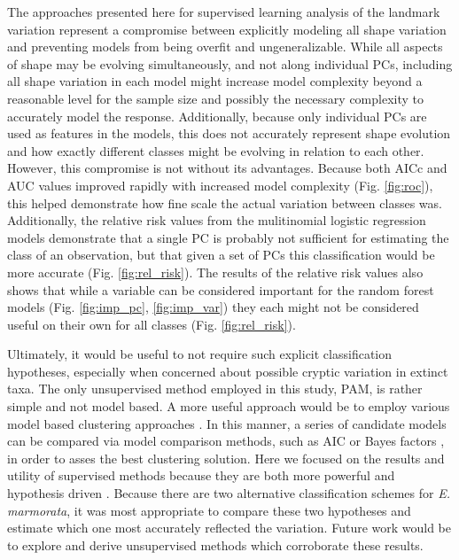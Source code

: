 \documentclass[12pt,letterpaper]{article}\usepackage{graphicx, color}
\begin{document}
The approaches presented here for supervised learning analysis of the landmark variation represent a compromise between explicitly modeling all shape variation and preventing models from being overfit and ungeneralizable. While all aspects of shape may be evolving simultaneously, and not along individual PCs, including all shape variation in each model might increase model complexity beyond a reasonable level for the sample size and possibly the necessary complexity to accurately model the response. Additionally, because only individual PCs are used as features in the models, this does not accurately represent shape evolution and how exactly different classes might be evolving in relation to each other. However, this compromise is not without its advantages. Because both AICc and AUC values improved rapidly with increased model complexity (Fig. \ref{fig:roc}), this helped demonstrate how fine scale the actual variation between classes was. Additionally, the relative risk values from the mulitinomial logistic regression models demonstrate that a single PC is probably not sufficient for estimating the class of an observation, but that given a set of PCs this classification would be more accurate (Fig. \ref{fig:rel_risk}). The results of the relative risk values also shows that while a variable can be considered important for the random forest models (Fig. \ref{fig:imp_pc}, \ref{fig:imp_var}) they each might not be considered useful on their own for all classes (Fig. \ref{fig:rel_risk}).

Ultimately, it would be useful to not require such explicit classification hypotheses, especially when concerned about possible cryptic variation in extinct taxa. The only unsupervised method employed in this study, PAM, is rather simple and not model based. A more useful approach would be to employ various model based clustering approaches \citep{Fraley2002,Zhong2003}. In this manner, a series of candidate models can be compared via model comparison methods, such as AIC or Bayes factors \citep{Fraley2002}, in order to asses the best clustering solution. %
Here we focused on the results and utility of supervised methods because they are both more powerful and hypothesis driven \citep{Hastie2009}. Because there are two alternative classification schemes for \textit{E. marmorata}, it was most appropriate to compare these two hypotheses and estimate which one most accurately reflected the variation. Future work would be to explore and derive unsupervised methods which corroborate these results.
\end{document}
